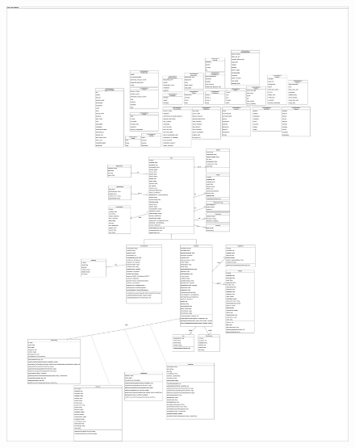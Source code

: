 \begin{appendices}
    \begin{figure}[H]
        \centering
        \includegraphics[width=\linewidth,height=\textheight]{src/assets/diagrams/Class_Diagram_related_to_user.png}
        \label{fig:class-diagram-related-to-user}
    \end{figure}    
\end{appendices}
